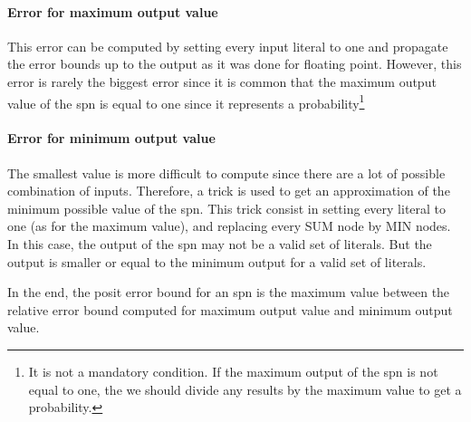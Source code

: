 \paragraph{Error for maximum output value}

This error can be computed by setting every input literal to one and propagate the error bounds up to the output as it was done for floating point. However, this error is rarely the biggest error since it is common that the maximum output value of the \gls{spn} is equal to one since it represents a probability\footnote{It is not a mandatory condition. If the maximum output of the \gls{spn} is not equal to one, the we should divide any results by the maximum value to get a probability.}

\paragraph{Error for minimum output value}

The smallest value is more difficult to compute since there are a lot of possible combination of inputs. Therefore, a trick is used to get an approximation of the minimum possible value of the \gls{spn}. This trick consist in setting every literal to one (as for the maximum value), and replacing every SUM node by MIN nodes. In this case, the output of the \gls{spn} may not be a valid set of literals. But the output is smaller or equal to the minimum output for a valid set of literals.

In the end, the posit error bound for an \gls{spn} is the maximum value between the relative error bound computed for maximum output value and minimum output value.
